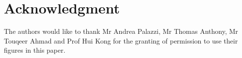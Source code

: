 \section*{Acknowledgment}

The authors would like to thank Mr Andrea Palazzi, Mr Thomas Anthony, Mr Touqeer Ahmad and Prof Hui Kong for the granting of permission to use their figures in this paper.

%
%
%
%
%
%
%
%
%
%
%
